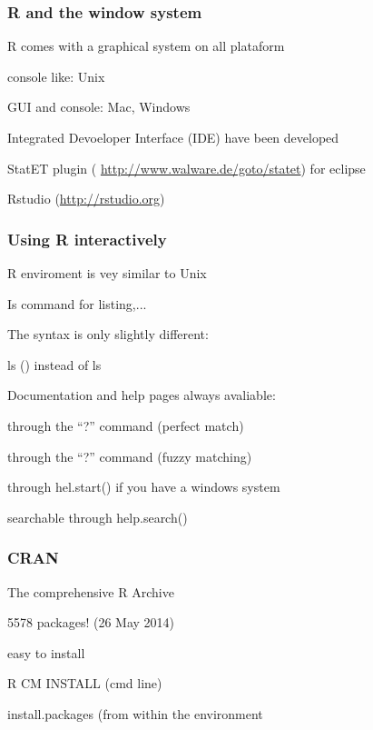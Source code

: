 \documentclass{beamer}
\begin{document}
   
     \begin{frame}
     \frametitle{R and the window system}
      \bit
	\item R comes with a graphical system on all plataform
	  \bit
	    \item console like: Unix
	    \item GUI and console: Mac, Windows
	  \eit
	 \item Integrated Devoeloper Interface (IDE) have been developed
	 \bit
	    \item StatET plugin ( \url{http://www.walware.de/goto/statet}) for eclipse
	    \item Rstudio (\url{http://rstudio.org})
	 \eit
      \eit
      
     \end{frame}
     
        \begin{frame}
     \frametitle{Using R interactively}
      \bit
	  \item R enviroment is vey similar to Unix
	    \bit
		\item Is command for listing,...
		\item The syntax is only slightly different:
		  \bit
		      \item ls () instead of ls
		  \eit
	    \eit
	   \item Documentation and help pages always avaliable:
	    \bit
		\item through the ``?'' command (perfect match)
		\item through the ``?'' command (fuzzy matching)
		\item through hel.start() if you have a windows system
		\item searchable through help.search()
	    \eit
	  
      \eit
     \end{frame}

          \begin{frame}
     \frametitle{CRAN}
      \bit
	  \item The comprehensive R Archive
	    \bit
		\item 5578 packages! (26 May 2014)
		\item easy to install
		  \bit
		      \item R CM INSTALL (cmd line)
		      \item install.packages (from within the environment
		  \eit
	    \eit
      \eit
     \end{frame}
     
\end{document}
